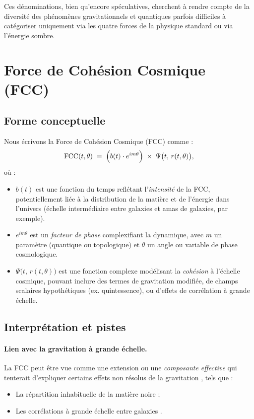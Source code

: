 \documentclass[12pt]{article}
\begin{document}
Ces dénominations, bien qu'encore spéculatives, cherchent à rendre compte 
de la diversité des phénomènes gravitationnels et quantiques parfois difficiles 
à catégoriser uniquement via les quatre forces de la physique standard 
ou via l'énergie sombre. 

\section{Force de Cohésion Cosmique (FCC)}

\subsection{Forme conceptuelle}

Nous écrivons la Force de Cohésion Cosmique (FCC) comme :
\begin{equation}
\label{eq:FCC}
\mathrm{FCC}(t,\theta) 
\;=\; \Bigl(b(t)\cdot e^{i m \theta}\Bigr)\;\times\;\Psi\bigl(t,\,r(t,\theta)\bigr),
\end{equation}
où :
\begin{itemize}
    \item $b(t)$ est une fonction du temps reflétant l'\emph{intensité} 
          de la FCC, potentiellement liée à la distribution de la matière et de l'énergie 
          dans l'univers (échelle intermédiaire entre galaxies et amas de galaxies, 
          par exemple).
    \item $e^{i m \theta}$ est un \emph{facteur de phase} complexifiant 
          la dynamique, avec $m$ un paramètre (quantique ou topologique) et $\theta$ 
          un angle ou variable de phase cosmologique.
    \item $\Psi\bigl(t,\,r(t,\theta)\bigr)$ est une fonction complexe 
          modélisant la \emph{cohésion} à l'échelle cosmique, pouvant inclure des termes 
          de gravitation modifiée, de champs scalaires hypothétiques (ex. quintessence), 
          ou d'effets de corrélation à grande échelle.
\end{itemize}

\subsection{Interprétation et pistes}

\paragraph{Lien avec la gravitation à grande échelle.}
La FCC peut être vue comme une extension ou une \emph{composante effective} 
qui tenterait d'expliquer certains effets non résolus de la gravitation 
\cite{planck2020parameters, clowe2006direct}, tels que :
\begin{itemize}
    \item La répartition inhabituelle de la matière noire \cite{bergstrom2000dark} ;
    \item Les corrélations à grande échelle entre galaxies \cite{einasto1997cosmos}.
\end{itemize}
\end{document}
